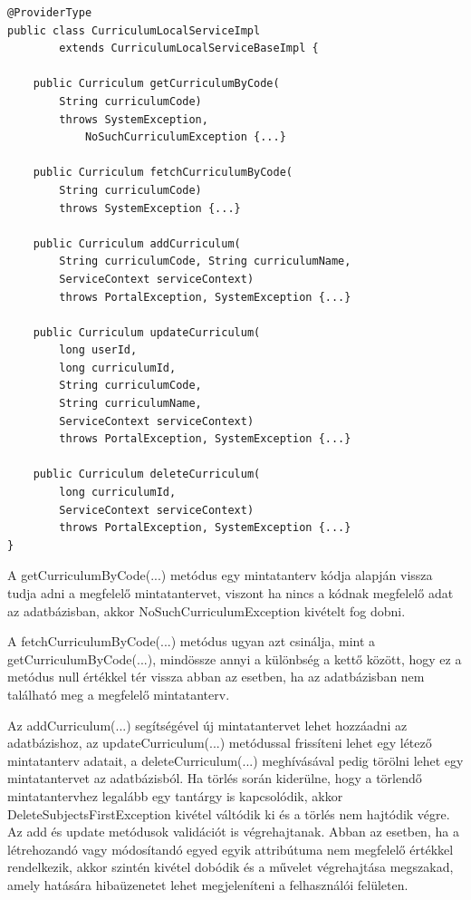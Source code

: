 \documentclass[hidelinks, 12pt, a4paper]{report}
\begin{document}
\begin{minipage}{\linewidth}
\begin{lstlisting}[basicstyle=\small]
@ProviderType
public class CurriculumLocalServiceImpl
		extends CurriculumLocalServiceBaseImpl {
	
	public Curriculum getCurriculumByCode(
		String curriculumCode)
		throws SystemException,
			NoSuchCurriculumException {...}

	public Curriculum fetchCurriculumByCode(
		String curriculumCode)
		throws SystemException {...}

	public Curriculum addCurriculum(
		String curriculumCode, String curriculumName,
		ServiceContext serviceContext)
		throws PortalException, SystemException {...}

	public Curriculum updateCurriculum(
		long userId,
		long curriculumId,
		String curriculumCode,
		String curriculumName,
		ServiceContext serviceContext)
		throws PortalException, SystemException {...}

	public Curriculum deleteCurriculum(
		long curriculumId,
		ServiceContext serviceContext)
		throws PortalException, SystemException {...}
}
\end{lstlisting}
\end{minipage}

A getCurriculumByCode(...) metódus egy mintatanterv kódja alapján vissza tudja adni a megfelelő mintatantervet, viszont ha nincs a kódnak megfelelő adat az adatbázisban, akkor NoSuchCurriculumException kivételt fog dobni.

A fetchCurriculumByCode(...) metódus ugyan azt csinálja, mint a getCurriculumByCode(...), mindössze annyi a különbség a kettő között, hogy ez a metódus null értékkel tér vissza abban az esetben, ha az adatbázisban nem található meg a megfelelő mintatanterv.

Az addCurriculum(...) segítségével új mintatantervet lehet hozzáadni az adatbázishoz, az updateCurriculum(...) metódussal frissíteni lehet egy létező mintatanterv adatait, a deleteCurriculum(...) meghívásával pedig törölni lehet egy mintatantervet az adatbázisból. Ha törlés során kiderülne, hogy a törlendő mintatantervhez legalább egy tantárgy is kapcsolódik, akkor DeleteSubjectsFirstException kivétel váltódik ki és a törlés nem hajtódik végre. Az add és update metódusok validációt is végrehajtanak. Abban az esetben, ha a létrehozandó vagy módosítandó egyed egyik attribútuma nem megfelelő értékkel rendelkezik, akkor szintén kivétel dobódik és a művelet végrehajtása megszakad, amely hatására hibaüzenetet lehet megjeleníteni a felhasználói felületen.
\end{document}

